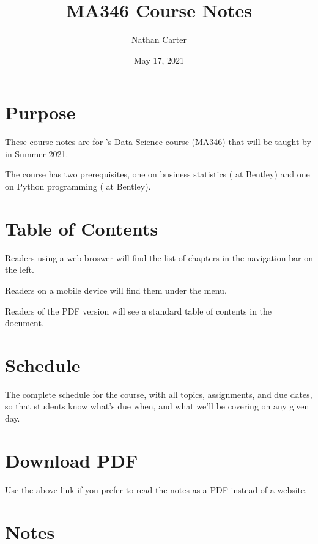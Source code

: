 \documentclass[letterpaper,10pt,english]{jupyterBook}
\title{MA346 Course Notes}
\date{May 17, 2021}
\author{Nathan Carter}
\begin{document}
\pagestyle{empty}
\sphinxmaketitle
\pagestyle{plain}
\sphinxtableofcontents
\pagestyle{normal}
\label{\detokenize{intro::doc}}



\part{ Purpose}
\label{\detokenize{intro:purpose}}
\sphinxAtStartPar
These course notes are for ’s Data Science course (MA346) that will be taught by  in Summer 2021.

\sphinxAtStartPar
The course has two prerequisites, one on business statistics ( at Bentley) and one on Python programming ( at Bentley).


\part{ Table of Contents}
\label{\detokenize{intro:table-of-contents}}
\sphinxAtStartPar
Readers using a web broswer will find the list of chapters in the navigation bar on the left.

\sphinxAtStartPar
Readers on a mobile device will find them under the  menu.

\sphinxAtStartPar
Readers of the PDF version will see a standard table of contents in the document.


\part{ Schedule}
\label{\detokenize{intro:schedule}}
\sphinxAtStartPar
The complete schedule for the course, with all topics, assignments, and due dates, so that students know what’s due when, and what we’ll be covering on any given day.


\part{ Download PDF}
\label{\detokenize{intro:a-href-static-ma346-course-notes-pdf-download-pdf-a}}
\sphinxAtStartPar
Use the above link if you prefer to read the notes as a PDF instead of a website.


\part{Notes}
\end{document}
